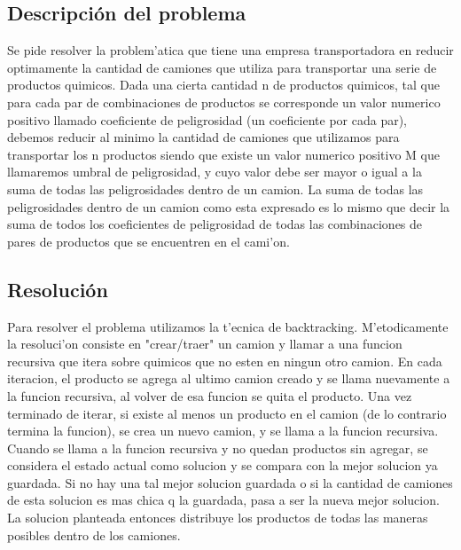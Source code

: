 \subsection{Descripci\'on del problema}

Se pide resolver la problem'atica que tiene una empresa transportadora en reducir optimamente la cantidad de camiones que utiliza para transportar una serie de productos quimicos. 
Dada una cierta cantidad n de productos quimicos, tal que para cada par de combinaciones de productos se corresponde un valor numerico positivo llamado coeficiente de peligrosidad (un coeficiente por cada par), debemos reducir al minimo la cantidad de camiones que utilizamos para transportar los n productos siendo que existe un valor numerico positivo M que llamaremos umbral de peligrosidad, y cuyo valor debe ser mayor o igual a la suma de todas las peligrosidades dentro de un camion. La suma de todas las peligrosidades dentro de un camion como esta expresado es lo mismo que decir la suma de todos los coeficientes de peligrosidad de todas las combinaciones de pares de productos que se encuentren en el cami'on.

\subsection{Resoluci\'on}

Para resolver el problema utilizamos la t'ecnica de backtracking. 
M'etodicamente la resoluci'on consiste en "crear/traer" un camion y llamar a una funcion recursiva que itera sobre quimicos que no esten en ningun otro camion. En cada iteracion, el producto se agrega al ultimo camion creado y se llama nuevamente a la funcion recursiva, al volver de esa funcion se quita el producto. Una vez terminado de iterar, si existe al menos un producto en el camion (de lo contrario termina la funcion), se crea un nuevo camion, y se llama a la funcion recursiva.
Cuando se llama a la funcion recursiva y no quedan productos sin agregar, se considera el estado actual como solucion y se compara con la mejor solucion ya guardada. Si no hay una tal mejor solucion guardada o si la cantidad de camiones de esta solucion es mas chica q la guardada, pasa a ser la nueva mejor solucion.
La solucion planteada entonces distribuye los productos de todas las maneras posibles dentro de los camiones. 


